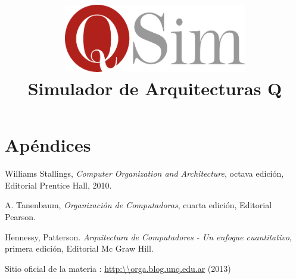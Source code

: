 \documentclass[10pt,a4paper]{article}
\author{\susi \and \tati}
\title{\includegraphics[width=8cm]{logo}\\Simulador de Arquitecturas Q}
\begin{document}
\maketitle

\newpage
\tableofcontents

\newpage





\appendix
\part{Apéndices}




\newpage
\begin{thebibliography}{9}

 Williams Stallings, \emph{Computer Organization and Architecture}, octava edición, Editorial Prentice Hall, 2010.

 A. Tanenbaum, \emph{Organización de Computadoras}, cuarta edición, Editorial Pearson.

 Hennessy, Patterson. \emph{Arquitectura de Computadores - Un enfoque cuantitativo}, primera edición,  Editorial Mc Graw Hill.

 Sitio oficial de la materia \orga: \url{http:\\orga.blog.unq.edu.ar} (2013)

\end{thebibliography}
\end{document}
